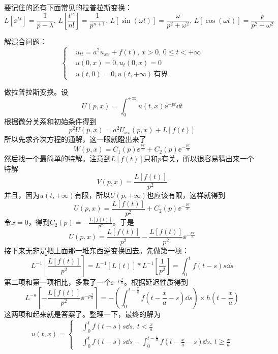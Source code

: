 要记住的还有下面常见的拉普拉斯变换：
\color{red}
\[L\left[\ee^{\lambda t}\right] = \frac{1}{p - \lambda},\, L\left[\frac{t^n}{n!}\right] = \frac{1}{p^{n+1}},\,L\left[\sin\left(\omega t\right)\right] = \frac{\omega}{p^2 + \omega^2},\, L\left[\cos\left(\omega t\right)\right] = \frac{p}{p^2 + \omega^2}\]
\color{black}
\begin{problembox}
\begin{example}
    解混合问题：
    \begin{equation*}
        \left\{
    \begin{aligned}
        &u_{tt} = a^2 u_{xx} + f\left(t\right),\, x>0, \,0 \leq t<+\infty\\
        &u\left(0, x\right) = 0, u_t\left(0, x\right) = 0\\
        &u\left(t, 0\right) = 0, u\left(t, +\infty\right)\,\text{有界}  
    \end{aligned}
    \right.
    \end{equation*}
\end{example}
\begin{solution}
做拉普拉斯变换。设
\[U\left(p, x\right) = \int_{0}^{+\infty} u\left(t, x\right) \ee^{- p t} \dd{t}\]
根据微分关系和初始条件得到
\[p^2 U\left(p, x\right) = a^2 U_{xx}\left(p, x\right) + L\left[f\left(t\right)\right]\]
所以先求齐次方程的通解，这一眼就瞪出来了
\[W\left(p, x\right) = C_1\left(p\right) \ee^{\frac{px}{a}} + C_2\left(p\right) \ee^{-\frac{px}{a}}\]
然后找一个最简单的特解。注意到$L\left[f\left(t\right)\right]$只和$p$有关，所以很容易猜出来一个特解
\[V\left(p, x\right) = \frac{L\left[f\left(t\right)\right]}{p^2}\]
并且，因为$u\left(t, +\infty\right)$有限，所以$U\left(p, +\infty\right)$也应该有限，这样就得到
\[U\left(p, x\right) = \frac{L\left[f\left(t\right)\right]}{p^2} + C_2\left(p\right) \ee^{-\frac{px}{a}}\]
令$x = 0$，得到$C_2\left(p\right) = -\frac{L\left[f\left(t\right)\right]}{p^2}$。于是
\[U\left(p, x\right) = \frac{L\left[f\left(t\right)\right]}{p^2} - \frac{L\left[f\left(t\right)\right]}{p^2} \ee^{-\frac{p x}{a}}\]
接下来无非是把上面那一堆东西逆变换回去。先做第一项：
\[L^{-1}\left[\frac{L\left[f\left(t\right)\right]}{p^2}\right] = L^{-1}\left[L\left(t\right)\right] * L^{-1}\left[\frac{1}{p^2}\right] = \int_{0}^{t} f\left(t - s\right) s \dd{s}\]
第二项和第一项相比，多乘了一个$\ee^{-p \frac{x}{a}}$。根据延迟性质得到
\[L^{-a}\left[-\frac{L\left[f\left(t\right)\right]}{p^2} \ee^{-p \frac{x}{a}}\right] = -\left(\int_{0}^{t - \frac{x}{a}} f\left(t - \frac{x}{a} - s\right) \dd{s}\right) \times h\left(t - \frac{x}{a}\right)\]
这两项和起来就是答案了。整理一下，最终的解为
\begin{equation*}
    u\left(t, x\right) = 
    \left\{
        \begin{aligned}
            &\int_{0}^{t} f\left(t - s\right) s \dd{s},\, t < \frac{x}{a}\\
            &\int_{0}^{t} f\left(t - s\right) s \dd{s} - \int_{0}^{t - \frac{x}{a}} f\left(t - \frac{x}{a} - s\right) \dd{s},\, t \geq \frac{x}{a}
        \end{aligned}
    \right.
\end{equation*}
\end{solution}
\end{problembox}
